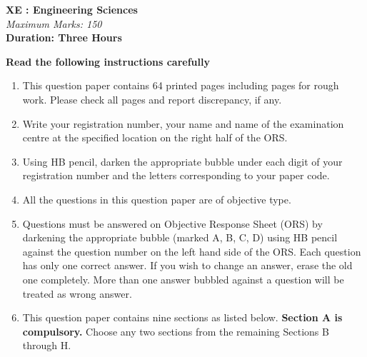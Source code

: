 \documentclass[12pt]{article}
\begin{document}
\begin{center}

   \textbf{\large XE : Engineering Sciences} \\[1em]
    \textit{Maximum Marks: 150} \\[1em]
    \textbf{Duration: Three Hours}
\end{center}


\textbf{Read the following instructions carefully}
\begin{enumerate}
    \item This question paper contains 64 printed pages including pages for rough work. Please check all pages and report discrepancy, if any.

    \item Write your registration number, your name and name of the examination centre at the specified location on the right half of the ORS.

    \item Using HB pencil, darken the appropriate bubble under each digit of your registration number and the letters corresponding to your paper code.

    \item All the questions in this question paper are of objective type.

    \item Questions must be answered on Objective Response Sheet (ORS) by darkening the appropriate bubble (marked A, B, C, D) using HB pencil against the question number on the left hand side of the ORS. Each question has only one correct answer. If you wish to change an answer, erase the old one completely. More than one answer bubbled against a question will be treated as wrong answer.

    \item This question paper contains nine sections as listed below. \textbf{Section A is compulsory.} Choose any two sections from the remaining Sections B through H.
\end{enumerate}
\end{document}

